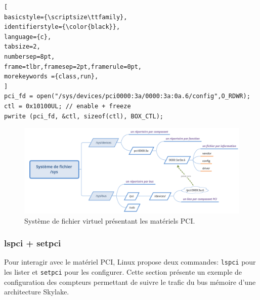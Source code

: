     
\begin{lstlisting}[
basicstyle={\scriptsize\ttfamily},
identifierstyle={\color{black}},
language={c},
tabsize=2,
numbersep=8pt,
frame=tlbr,framesep=2pt,framerule=0pt,
morekeywords ={class,run},
]
pci_fd = open("/sys/devices/pci0000:3a/0000:3a:0a.6/config",O_RDWR);
ctl = 0x10100UL; // enable + freeze
pwrite (pci_fd, &ctl, sizeof(ctl), BOX_CTL);
\end{lstlisting}

    
    \begin{figure}
    \center
    \includegraphics[width=12cm]{images/edl_perf_sys_pci.png}
    \caption{\label{fig:edl_perf_sys_pci} Système de fichier virtuel présentant les matériels PCI.}
    \end{figure}

    
    \subsubsection{lspci + setpci}
    
    Pour interagir avec le matériel PCI, Linux propose deux commandes: \verb|lspci| pour les lister et \verb|setpci| pour les configurer. Cette section présente un exemple de configuration des compteurs permettant de suivre le trafic du bus mémoire d'une architecture Skylake. 
    
    
    
